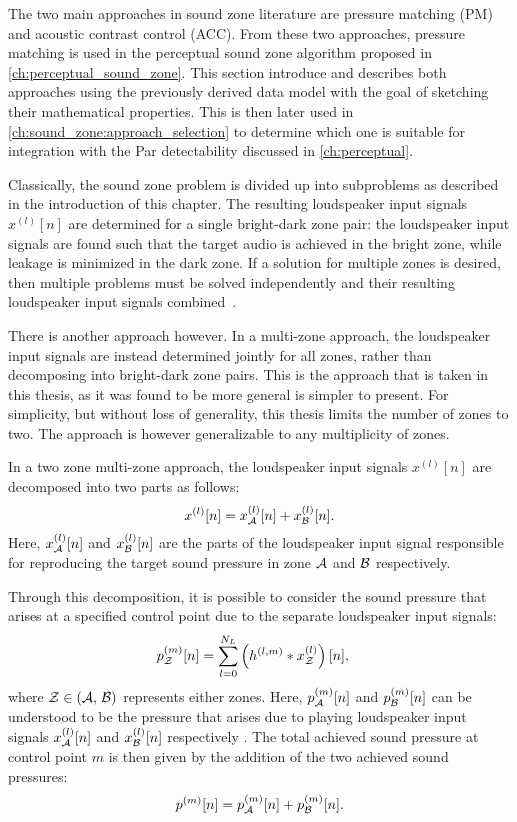 The two main approaches in sound zone literature are pressure matching (PM) and acoustic contrast control (ACC).
From these two approaches, pressure matching is used in the perceptual sound zone algorithm proposed in \autoref{ch:perceptual_sound_zone}.
This section introduce and describes both approaches using the previously derived data model with the goal of sketching their mathematical properties.
This is then later used in \autoref{ch:sound_zone:approach_selection} to determine which one is suitable for integration with the 
Par detectability discussed in \autoref{ch:perceptual}.

Classically, the sound zone problem is divided up into subproblems as described in the introduction of this chapter.
The resulting loudspeaker input signals $x^{(l)}[n]$ are determined for a single bright-dark zone pair:
the loudspeaker input signals are found such that the target audio is achieved in the bright zone, while leakage is minimized in the dark zone.
If a solution for multiple zones is desired, then multiple problems must be solved independently and their resulting loudspeaker input signals combined~\cite{betlehem2015personal}.

There is another approach however.
In a multi-zone approach, the loudspeaker input signals are instead determined jointly for all zones, rather than decomposing into bright-dark zone pairs.
This is the approach that is taken in this thesis, as it was found to be more general is simpler to present.
For simplicity, but without loss of generality, this thesis limits the number of zones to two.
The approach is however generalizable to any multiplicity of zones.

In a two zone multi-zone approach, the loudspeaker input signals $x^{(l)}[n]$ are decomposed into two parts as follows:
\begin{equation}
    x^{(l)}[n] = x_{\mathcal{A}}^{(l)}[n] + x_{\mathcal{B}}^{(l)}[n].
\end{equation}
Here, $x_{\mathcal{A}}^{(l)}[n]$ and $x_{\mathcal{B}}^{(l)}[n]$ are the parts of the loudspeaker input signal responsible for reproducing the target sound pressure 
in zone $\mathcal{A}$ and $\mathcal{B}$ respectively.

Through this decomposition, it is possible to consider the sound pressure that arises at a specified control point due to the separate loudspeaker input signals:
\begin{align}
    p_{\mathcal{Z}}^{(m)}[n] &= \sum_{l=0}^{N_L} \left(h^{(l,m)} \ast x_{\mathcal{Z}}^{(l)}\right)[n],
\end{align}
\label{eq:sound_zone:approaches:pressure}
where $\mathcal{Z} \in \left(\mathcal{A},\,\mathcal{B}\right)$ represents either zones.
Here, $p_{\mathcal{A}}^{(m)}[n]$ and $p_{\mathcal{B}}^{(m)}[n]$ can be understood to be the pressure that arises due to 
playing loudspeaker input signals $x_{\mathcal{A}}^{(l)}[n]$ and $x_{\mathcal{B}}^{(l)}[n]$ respectively . 
The total achieved sound pressure at control point $m$ is then given by the addition of the two achieved sound pressures:
\begin{equation}
    p^{(m)}[n] = p_{\mathcal{A}}^{(m)}[n] + p_{\mathcal{B}}^{(m)}[n].
\end{equation}


